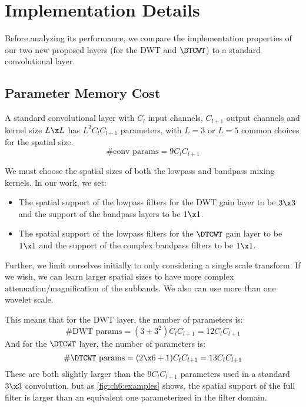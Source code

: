 \section{Implementation Details}

Before analyzing its performance, we compare the implementation properties of
our two new proposed layers (for the DWT and $\DTCWT$) to a standard
convolutional layer.

\subsection{Parameter Memory Cost}\label{sec:ch6:memory}
A standard convolutional layer with $C_l$ input channels, $C_{l+1}$ output channels
and kernel size $L\x L$ has $L^2C_{l}C_{l+1}$ parameters, with $L=3$ or $L=5$
common choices for the spatial size.
\begin{equation}
  \text{#conv params} = 9C_lC_{l+1}
\end{equation}

We must choose the spatial sizes of both the lowpass and bandpass
mixing kernels. In our work, we set:
%
\begin{itemize}
  \item The spatial support of the lowpass filters for the DWT gain 
    layer to be $3\x 3$ and the support of the bandpass layers to be $1\x 1$.
  \item The spatial support of the lowpass filters for the $\DTCWT$ gain layer to
    be $1\x 1$ and the support of the complex bandpass filters to be $1\x 1$.
\end{itemize}
%
Further, we limit ourselves initially to only considering a single scale
transform.  If we wish, we can learn larger spatial sizes to have more complex
attenuation/magnification of the subbands. We also can use more than one wavelet
scale. 

This means that for the DWT layer, the number of parameters is:
%
\begin{equation}
  \text{\#DWT params} = (3 + 3^2)C_lC_{l+1} = 12C_lC_{l+1} \label{eq:ch6:memcost1}
\end{equation} 
%
And for the $\DTCWT$ layer, the number of parameters is:
\begin{equation}
  \text{\#$\DTCWT$ params} = (2\x 6 + 1)C_lC_{l+1} = 13C_lC_{l+1} \label{eq:ch6:memcost2}
\end{equation} 
%
These are both slightly larger than the $9C_lC_{l+1}$ parameters used in a
standard $3\x 3$ convolution, but as \autoref{fig:ch6:examples} shows, the
spatial support of the full filter is larger than an equivalent one
parameterized in the filter domain. 

